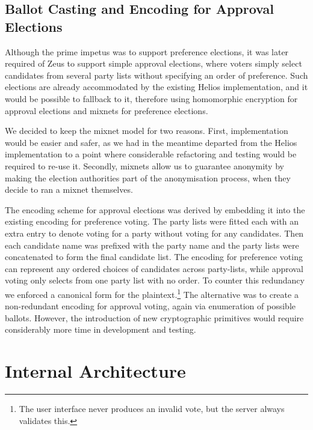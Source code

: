\documentclass[letterpaper,twocolumn,10pt]{article}
\begin{document}

\subsection{Ballot Casting and Encoding for Approval Elections}

Although the prime impetus was to support preference elections, it was
later required of Zeus to support simple approval elections, where
voters simply select candidates from several party lists without
specifying an order of preference. Such elections are already
accommodated by the existing Helios implementation, and it would be
possible to fallback to it, therefore using homomorphic encryption for
approval elections and mixnets for preference elections.

We decided to keep the mixnet model for two reasons. First,
implementation would be easier and safer, as we had in the meantime
departed from the Helios implementation to a point where considerable
refactoring and testing would be required to re-use it. Secondly,
mixnets allow us to guarantee anonymity by making the election
authorities part of the anonymisation process, when they decide to
ran a mixnet themselves.

The encoding scheme for approval elections was derived by embedding it
into the existing encoding for preference voting. The party lists were
fitted each with an extra entry to denote voting for a party without
voting for any candidates. Then each candidate name was prefixed with
the party name and the party lists were concatenated to form the final
candidate list. The encoding for preference voting can represent any
ordered choices of candidates across party-lists, while approval voting
only selects from one party list with no order. To counter this
redundancy we enforced a canonical form for the plaintext.\footnote{The
user interface never produces an invalid vote, but the server always
validates this.}
The alternative was to create a non-redundant encoding for approval
voting, again via enumeration of possible ballots. However, the
introduction of new cryptographic primitives would require considerably
more time in development and testing.


\section{Internal Architecture}
\label{architecture}
\end{document}
